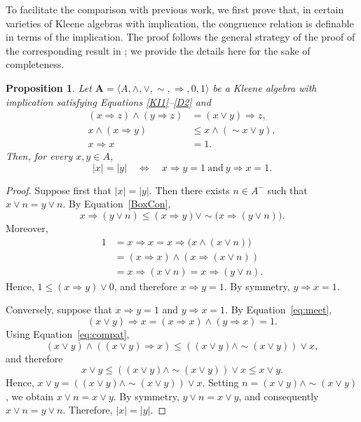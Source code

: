 \documentclass{article}
\newtheorem{proposition}[theorem]{Proposition}
\newcommand{\A}{\mathbf{A}}
\begin{document}
To facilitate the comparison with previous work, we first prove that, in certain varieties of Kleene algebras with implication, the congruence relation is definable in terms of the implication. The proof follows the general strategy of the proof of the corresponding result in \cite[p.~154]{viglizzo99algebras}; we provide the details here for the sake of completeness.


\begin{proposition}\label{congruenciaImplicacion}
Let $\A=\langle A,\wedge,\vee,\sim,\Rightarrow,0,1\rangle$ be a Kleene algebra with implication satisfying Equations \eqref{KI1}--\eqref{D2} and
\begin{align} 
(x\Rightarrow z)\wedge(y\Rightarrow z) &=(x\vee y)\Rightarrow z,\label{eq:meet}\tag{KI2}\\ 
x\wedge(x\Rightarrow y) &\le x\wedge(\sim x\vee y),\label{eq:compat}\tag{KI5}\\ 
x\Rightarrow x &=1.\label{eq:refl} \tag{KI6}
\end{align}
Then, for every $x,y\in A$,
\[
|x|=|y|
\quad\Longleftrightarrow\quad
x\Rightarrow y=1
\ \text{and}\
y\Rightarrow x=1.
\]
\end{proposition}
\begin{proof}
Suppose first that $|x|=|y|$. Then there exists $n\in A^{-}$ such that $x\vee n=y\vee n$. By Equation~\eqref{BoxCon},
\[
x\Rightarrow(y\vee n)
\leq
(x\Rightarrow y)\vee
\sim\bigl(x\Rightarrow(y\vee n)\bigr).
\]
Moreover,
\begin{align*}
1
&=x\Rightarrow x
=x\Rightarrow\bigl(x\wedge(x\vee n)\bigr)\\
&=(x\Rightarrow x)\wedge(x\Rightarrow(x\vee n))\\
&=x\Rightarrow(x\vee n)
=x\Rightarrow(y\vee n).
\end{align*}
Hence, $1\leq (x\Rightarrow y)\vee0$,
and therefore $x\Rightarrow y=1$. By symmetry, $y\Rightarrow x=1$.

Conversely, suppose that $x\Rightarrow y=1$ and $y\Rightarrow x=1$. By Equation~\eqref{eq:meet},
\[
(x\vee y)\Rightarrow x
=(x\Rightarrow x)\wedge(y\Rightarrow x)
=1.
\]
Using Equation~\eqref{eq:compat},
\[
(x\vee y)\wedge((x\vee y)\Rightarrow x)
\leq
((x\vee y)\wedge\sim(x\vee y))\vee x,
\]
and therefore
\[
x\vee y
\leq
((x\vee y)\wedge\sim(x\vee y))\vee x
\leq
x\vee y.
\]
Hence, $x\vee y=((x\vee y)\wedge\sim(x\vee y))\vee x$. Setting $n=(x\vee y)\wedge\sim(x\vee y)$, we obtain $x\vee n=x\vee y$. By symmetry, $y\vee n=x\vee y$, and consequently $x\vee n=y\vee n$. Therefore, $|x|=|y|$.
\end{proof}
\end{document}
